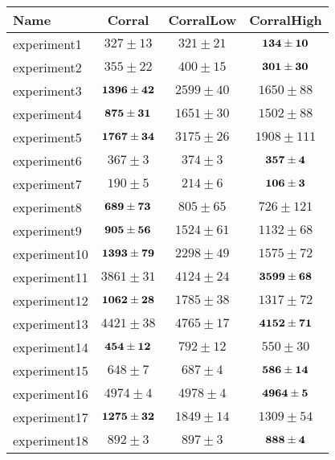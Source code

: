 \begin{tabular}{|l |c|c|c|}
\hline 
Name & Corral & CorralLow & CorralHigh \\
 \hline 
experiment1 & {$327\pm 13 $}& {$321\pm 21 $}& {$\bf 134\pm 10 $}\\
experiment2 & {$355\pm 22 $}& {$400\pm 15 $}& {$\bf 301\pm 30 $}\\
experiment3 & {$\bf 1396\pm 42 $}& {$2599\pm 40 $}& {$1650\pm 88 $}\\
experiment4 & {$\bf 875\pm 31 $}& {$1651\pm 30 $}& {$1502\pm 88 $}\\
experiment5 & {$\bf 1767\pm 34 $}& {$3175\pm 26 $}& {$1908\pm 111 $}\\
experiment6 & {$367\pm 3 $}& {$374\pm 3 $}& {$\bf 357\pm 4 $}\\
experiment7 & {$190\pm 5 $}& {$214\pm 6 $}& {$\bf 106\pm 3 $}\\
experiment8 & {$\bf 689\pm 73 $}& {$805\pm 65 $}& {$726\pm 121 $}\\
experiment9 & {$\bf 905\pm 56 $}& {$1524\pm 61 $}& {$1132\pm 68 $}\\
experiment10 & {$\bf 1393\pm 79 $}& {$2298\pm 49 $}& {$1575\pm 72 $}\\
experiment11 & {$3861\pm 31 $}& {$4124\pm 24 $}& {$\bf 3599\pm 68 $}\\
experiment12 & {$\bf 1062\pm 28 $}& {$1785\pm 38 $}& {$1317\pm 72 $}\\
experiment13 & {$4421\pm 38 $}& {$4765\pm 17 $}& {$\bf 4152\pm 71 $}\\
experiment14 & {$\bf 454\pm 12 $}& {$792\pm 12 $}& {$550\pm 30 $}\\
experiment15 & {$648\pm 7 $}& {$687\pm 4 $}& {$\bf 586\pm 14 $}\\
experiment16 & {$4974\pm 4 $}& {$4978\pm 4 $}& {$\bf 4964\pm 5 $}\\
experiment17 & {$\bf 1275\pm 32 $}& {$1849\pm 14 $}& {$1309\pm 54 $}\\
experiment18 & {$892\pm 3 $}& {$897\pm 3 $}& {$\bf 888\pm 4 $}\\
\hline 
 \end{tabular}